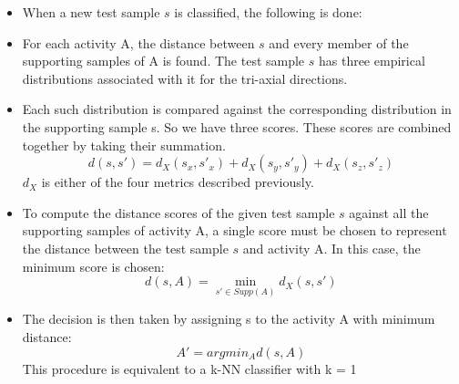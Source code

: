\documentclass{beamer}
\begin{document}
\begin{frame}
    \begin{itemize}
        \item When a new test sample $s$ is classified, the following is done:
        \item For each activity A, the distance between $s$ and every member of the supporting samples of A is found. The test sample $s$ has three empirical distributions associated with it for the tri-axial directions.
        \item Each such distribution is compared against the corresponding distribution in the supporting sample s. So we have three scores. These scores are combined together by taking their summation.
        \begin{equation}
            d(s, s') = d_X(s_x, s'_x) + d_X(s_y, s'_y) + d_X(s_z, s'_z)
        \end{equation}
        $d_X$ is either of the four metrics described previously.
    \end{itemize}
\end{frame}
\begin{frame}
    \begin{itemize}
        \item To compute the distance scores of the given test sample $s$ against all the supporting samples of activity A, a single score must be chosen to represent the distance between the test sample $s$ and activity A. In this case, the minimum score is chosen:
        \begin{equation}
            d(s,A) = \min _{s' \in Supp(A)} d_X(s, s')
        \end{equation}
        \item The decision is then taken by assigning s to the activity A with minimum distance: \begin{equation}
            A' = argmin_Ad(s,A)
        \end{equation}
        This procedure is equivalent to a k-NN classifier with k = 1
    \end{itemize}
\end{frame}
\end{document}
